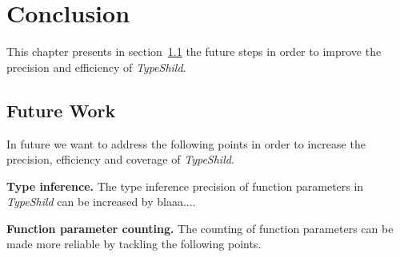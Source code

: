 \chapter{Conclusion}
\label{chapter:Future_Work}

This chapter presents in section~\ref{Future Work} the future steps in order to improve the
precision and efficiency of \textit{TypeShild}.

\section{Future Work} 
\label{Future Work} 

In future we want to address the following points in order to increase the precision, efficiency
and coverage of \textit{TypeShild}.

\textbf{Type inference.} The type inference precision of function parameters in \textit{TypeShild} can be 
increased by blaaa....

\textbf{Function parameter counting.}
The counting of function parameters can be made more reliable by tackling the following points.
